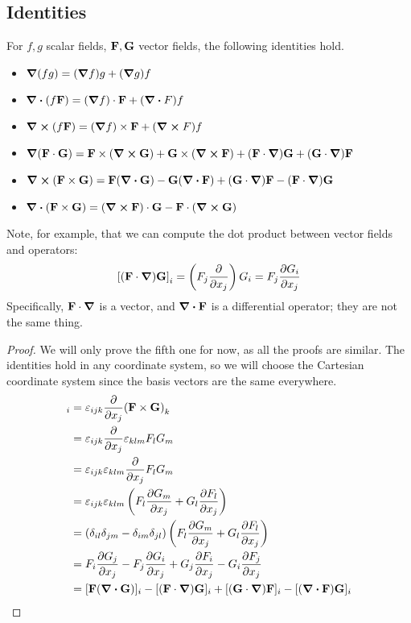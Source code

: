 \subsection{Identities}
\begin{proposition}
	For \(f, g\) scalar fields, \(\vb F, \vb G\) vector fields, the following identities hold.
	\begin{itemize}
		\item \(\grad(fg) = (\grad f)g + (\grad g)f\)
		\item \(\div(f \vb F) = (\grad f)\cdot \vb F + (\div F)f\)
		\item \(\curl(f \vb F) = (\grad f)\times \vb F + (\curl F)f\)
		\item \(\grad(\vb F \cdot \vb G) = \vb F \times (\curl{\vb G}) + \vb G \times (\curl{\vb F}) + (\vb F \cdot \grad)\vb G + (\vb G \cdot \grad)\vb F\)
		\item \(\curl(\vb F \times \vb G) = \vb F(\div{\vb G}) - \vb G(\div{\vb F}) + (\vb G \cdot \grad)\vb F - (\vb F \cdot \grad)\vb G\)
		\item \(\div(\vb F \times \vb G) = (\curl{\vb F}) \cdot \vb G - \vb F \cdot (\curl{\vb G})\)
	\end{itemize}
\end{proposition}
\noindent Note, for example, that we can compute the dot product between vector fields and operators:
\[
	\left[ (\vb F \cdot \grad) \vb G \right]_i = \left( F_j \pdv{x_j} \right) G_i = F_j \pdv{G_i}{x_j}
\]
Specifically, \(\vb F \cdot \grad\) is a vector, and \(\div{\vb F}\) is a differential operator; they are not the same thing.
\begin{proof}
	We will only prove the fifth one for now, as all the proofs are similar.
	The identities hold in any coordinate system, so we will choose the Cartesian coordinate system since the basis vectors are the same everywhere.
	\begin{align*}
		[\curl(\vb F \times \vb G)]_i & = \varepsilon_{ijk} \pdv{x_j} (\vb F \times \vb G)_k                                                            \\
		                              & = \varepsilon_{ijk} \pdv{x_j} \varepsilon_{klm} F_l G_m                                                         \\
		                              & = \varepsilon_{ijk} \varepsilon_{klm} \pdv{x_j} F_l G_m                                                         \\
		                              & = \varepsilon_{ijk} \varepsilon_{klm} \left( F_l \pdv{G_m}{x_j} + G_l \pdv{F_l}{x_j}  \right)                   \\
		                              & = (\delta_{il}\delta_{jm} - \delta_{im}\delta_{jl}) \left( F_l \pdv{G_m}{x_j} + G_l \pdv{F_l}{x_j} \right)      \\
		                              & = F_i \pdv{G_j}{x_j} - F_j \pdv{G_i}{x_j} + G_j \pdv{F_i}{x_j} - G_i \pdv{F_j}{x_j}                             \\
		                              & = [\vb F(\div{\vb G})]_i - [(\vb F \cdot \grad)\vb G]_i + [(\vb G \cdot \grad)\vb F]_i - [(\div{\vb F})\vb G]_i
	\end{align*}
\end{proof}

